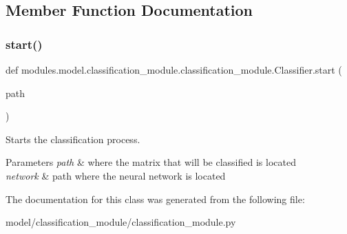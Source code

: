 \subsection{Member Function Documentation}
\mbox{\label{classmodules_1_1model_1_1classification__module_1_1classification__module_1_1_classifier_a0171fa6530689c47b0bfda8bdadd986a}} 
\subsubsection{\texorpdfstring{start()}{start()}}
{\footnotesize\ttfamily def modules.\+model.\+classification\+\_\+module.\+classification\+\_\+module.\+Classifier.\+start (\begin{DoxyParamCaption}\item[{}]{path }\end{DoxyParamCaption})\hspace{0.3cm}{\ttfamily [static]}}



Starts the classification process. 


\begin{DoxyParams}{Parameters}
{\em path} & where the matrix that will be classified is located \\
\hline
{\em network} & path where the neural network is located \\
\hline
\end{DoxyParams}


The documentation for this class was generated from the following file\+:\begin{DoxyCompactItemize}
\item 
model/classification\+\_\+module/classification\+\_\+module.\+py\end{DoxyCompactItemize}
